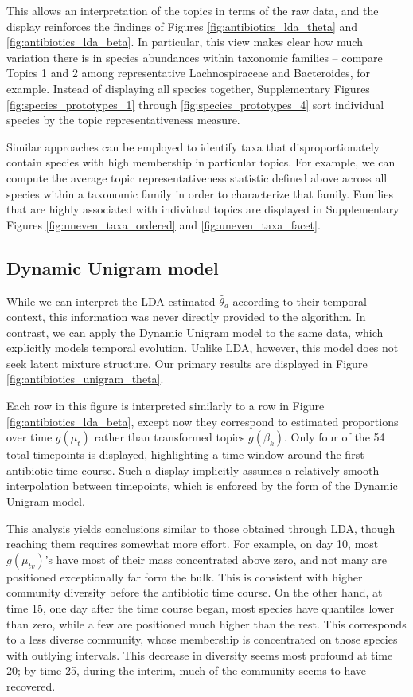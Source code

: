 \documentclass[oupdraft]{bio}
\begin{document}
This allows an interpretation of the topics in terms of the raw data, and the
display reinforces the findings of Figures \ref{fig:antibiotics_lda_theta} and
\ref{fig:antibiotics_lda_beta}. In particular, this view makes clear how much
variation there is in species abundances within taxonomic families -- compare
Topics 1 and 2 among representative Lachnospiraceae and Bacteroides, for
example. Instead of displaying all species together, Supplementary Figures
\ref{fig:species_prototypes_1} through \ref{fig:species_prototypes_4} sort
individual species by the topic representativeness measure.

Similar approaches can be employed to identify taxa that disproportionately
contain species with high membership in particular topics. For example, we can
compute the average topic representativeness statistic defined above across all
species within a taxonomic family in order to characterize that family. Families
that are highly associated with individual topics are displayed in Supplementary
Figures \ref{fig:uneven_taxa_ordered} and \ref{fig:uneven_taxa_facet}.

\subsection{Dynamic Unigram model}
\label{sec:antibiotics_unigram}

While we can interpret the LDA-estimated $\hat{\theta}_{d}$ according to their
temporal context, this information was never directly provided to the algorithm.
In contrast, we can apply the Dynamic Unigram model to the same data, which
explicitly models temporal evolution. Unlike LDA, however, this model does not
seek latent mixture structure. Our primary results are displayed in Figure
\ref{fig:antibiotics_unigram_theta}.

Each row in this figure is interpreted similarly to a row in Figure
\ref{fig:antibiotics_lda_beta}, except now they correspond to estimated
proportions over time $g\left(\mu_{t}\right)$ rather than transformed topics
$g\left(\beta_{k}\right)$. Only four of the 54 total timepoints
is displayed, highlighting a time window around the first antibiotic time
course. Such a display implicitly assumes a relatively smooth interpolation
between timepoints, which is enforced by the form of the Dynamic Unigram model.

This analysis yields conclusions similar to those obtained through LDA, though
reaching them requires somewhat more effort. For example, on day 10, most
$g\left(\mu_{tv}\right)$'s have most of their mass concentrated above zero, and
not many are positioned exceptionally far form the bulk. This is consistent with
higher community diversity before the antibiotic time course. On the other hand,
at time 15, one day after the time course began, most species have quantiles
lower than zero, while a few are positioned much higher than the rest. This
corresponds to a less diverse community, whose membership is concentrated on
those species with outlying intervals. This decrease in diversity seems most
profound at time 20; by time 25, during the interim, much of the community seems
to have recovered.
\end{document}
